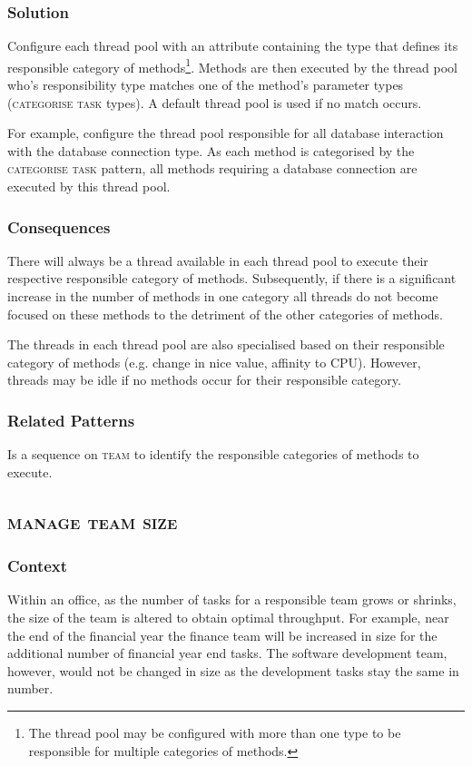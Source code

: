 \documentclass[prodmode]{style/acmlarge}
\begin{document}
\subsubsection*{\textbf{Solution}} Configure each thread pool with an attribute
containing the type that defines its responsible category of
methods\footnote{The thread pool may be configured with more than one type to be
responsible for multiple categories of methods.}. Methods are then executed by
the thread pool who's responsibility type matches one of the method's parameter
types (\textsc{categorise task} types).  A default thread pool is used if no
match occurs.

For example, configure the thread pool responsible for all database interaction
with the database connection type.  As each method is categorised by the
\textsc{categorise task} pattern, all methods requiring a database connection
are executed by this thread pool.

\subsubsection*{Consequences} There will always be a thread available in each
thread pool to execute their respective responsible category of methods. 
Subsequently, if there is a significant increase in the number of methods in one
category all threads do not become focused on these methods to the detriment of
the other categories of methods.

The threads in each thread pool are also specialised based on their responsible
category of methods (e.g. change in nice value, affinity to CPU).  However,
threads may be idle if no methods occur for their responsible category.

\subsubsection*{Related Patterns} Is a sequence on \textsc{team} to identify
the responsible categories of methods to execute.



\subsection{\textsc{\textbf{manage team size}}}

\subsubsection*{Context} Within an office, as the number of tasks for a
responsible team grows or shrinks, the size of the team is altered to obtain
optimal throughput.  For example, near the end of the financial year the finance
team will be increased in size for the additional number of financial year end
tasks.  The software development team, however, would not be changed in size as
the development tasks stay the same in number.
\end{document}
